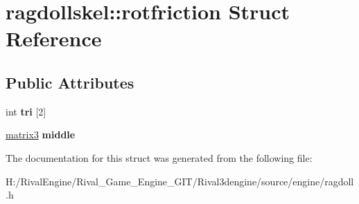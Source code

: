 \hypertarget{structragdollskel_1_1rotfriction}{}\section{ragdollskel\+:\+:rotfriction Struct Reference}
\label{structragdollskel_1_1rotfriction}
\subsection*{Public Attributes}
\begin{DoxyCompactItemize}
\item 
\mbox{\label{structragdollskel_1_1rotfriction_af1d885471258b41e4be96a0ae437d025}} 
int {\bfseries tri} \mbox{[}2\mbox{]}
\item 
\mbox{\label{structragdollskel_1_1rotfriction_af6fba88e00ea38ec5f47e503d9d6624d}} 
\hyperlink{structmatrix3}{matrix3} {\bfseries middle}
\end{DoxyCompactItemize}


The documentation for this struct was generated from the following file\+:\begin{DoxyCompactItemize}
\item 
H\+:/\+Rival\+Engine/\+Rival\+\_\+\+Game\+\_\+\+Engine\+\_\+\+G\+I\+T/\+Rival3dengine/source/engine/ragdoll.\+h\end{DoxyCompactItemize}
